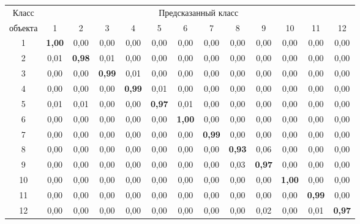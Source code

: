 \begin{table*}\small %
\begin{center}
\parbox{380pt}{

}
\label{tbl:hyperparams_confusion}
\vspace*{2ex}

\begin{tabular}{|c|c|c|c|c|c|c|c|c|c|c|c|c|}
  \hline
Класс & \multicolumn{12}{c|}{Предсказанный класс} \\ 
\cline{2-13}
объекта & 1 & 2 & 3 & 4 & 5 & 6 & 7 & 8& 9 & 10 & 11 & 12\\ 
\hline
 1 & \textbf{1{,}00} & 0,00 & 0,00 & 0,00 & 0,00 & 0,00 & 0,00 & 0,00 & 0,00 & 0,00 & 0,00 & 0,00\\ 
 2 & 0,01 & \textbf{0,98} & 0,01 & 0,00 & 0,00 & 0,00 & 0,00 & 0,00 & 0,00 & 0,00 & 0,00 & 0,00\\ 
 3 & 0,00 & 0,00 & \textbf{0{,}99} & 0,01 & 0,00 & 0,00 & 0,00 & 0,00 & 0,00 & 0,00 & 0,00 & 0,00\\ 
 4 & 0,00 & 0,00 & 0,00 & \textbf{0{,}99} & 0,01 & 0,00 & 0,00 & 0,00 & 0,00 & 0,00 & 0,00 & 0,00\\ 
 5 & 0,01 & 0,01 & 0,00 & 0,00 & \textbf{0{,}97} & 0,01 & 0,00 & 0,00 & 0,00 & 0,00 & 0,00 & 0,00\\ 
 6 & 0,00 & 0,00 & 0,00 & 0,00 & 0,00 & \textbf{1{,}00} & 0,00 & 0,00 & 0,00 & 0,00 & 0,00 & 0,00\\ 
 7 & 0,00 & 0,00 & 0,00 & 0,00 & 0,00 & 0,00 & \textbf{0{,}99} & 0,00 & 0,00 & 0,00 & 0,00 & 0,00\\ 
 8 & 0,00 & 0,00 & 0,00 & 0,00 & 0,00 & 0,00 & 0,00 & \textbf{0{,}93} & 0,06 & 0,00 & 0,00 & 0,00\\
 9 & 0,00 & 0,00 & 0,00 & 0,00 & 0,00 & 0,00 & 0,00 & 0,03 & \textbf{0{,}97} & 0,00 & 0,00 & 0,00\\
 10\hphantom{9} & 0,00 & 0,00 & 0,00 & 0,00 & 0,00 & 0,00 & 0,00 & 0,00 & 0,00 & \textbf{1{,}00} & 0,00 & 0,00\\ 
 11\hphantom{9} & 0,00 & 0,00 & 0,00 & 0,00 & 0,00 & 0,00 & 0,00 & 0,00 & 0,00 & 0,00 & \textbf{0{,}99} & 0,00\\
 12\hphantom{9} & 0,00 & 0,00 & 0,00 & 0,00 & 0,00 & 0,00 & 0,00 & 0,00 & 0,02 & 0,00 & 0,01 & 
 \textbf{0{,}97}\\
 \hline
\end{tabular}
\end{center}
\end{table*}

